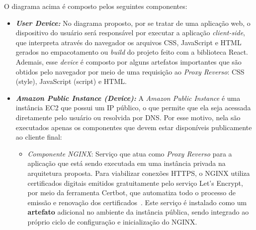 O diagrama acima é composto pelos seguintes componentes:
\begin{itemize}
  \item \textbf{\textit{User Device:}} No diagrama proposto, por se tratar de uma aplicação web, o dispositivo do usuário será responsável por executar a aplicação \textit{client-side}, que interpreta através do navegador os arquivos CSS, JavaScript e HTML gerados no empacotamento ou \textit{build} do projeto feito com a biblioteca React. Ademais, esse \textit{device} é composto por alguns artefatos importantes que são obtidos pelo navegador por meio de uma requisição ao \textit{Proxy Reverso}: CSS (style), JavaScript (script) e HTML.

  \item \textbf{\textit{Amazon Public Instance (Device):}} A \textit{Amazon Public Instance} é uma instância EC2 que possui um IP público, o que permite que ela seja acessada diretamente pelo usuário ou resolvida por DNS. Por esse motivo, nela são executados apenas os componentes que devem estar disponíveis publicamente ao cliente final:
    \begin{itemize}
      \item \textit{Componente NGINX}: Serviço que atua como \textit{Proxy Reverso} para a aplicação que está sendo executada em uma instância privada na arquitetura proposta. Para viabilizar conexões HTTPS, o NGINX utiliza certificados digitais emitidos gratuitamente pelo serviço Let's Encrypt, por meio da ferramenta Certbot, que automatiza todo o processo de emissão e renovação dos certificados~\cite{LetsEncryptWithCertbot}. Este serviço é instalado como um \textbf{artefato} adicional no ambiente da instância pública, sendo integrado ao próprio ciclo de configuração e inicialização do NGINX.
    \end{itemize}


\end{itemize}
